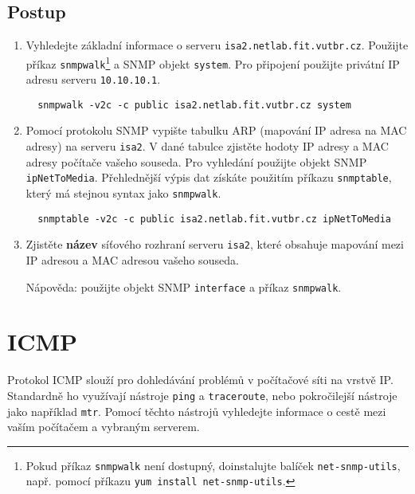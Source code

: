 \subsection*{Postup}
\begin{enumerate}
  \item Vyhledejte základní informace o serveru {\tt isa2.netlab.fit.vutbr.cz}.  Použijte příkaz {\tt snmpwalk}\footnote{Pokud příkaz {\tt snmpwalk} není dostupný, doinstalujte balíček \texttt{net-snmp-utils}, např. pomocí příkazu \texttt{yum install net-snmp-utils}.} a SNMP objekt \texttt{system}. Pro připojení použijte privátní IP adresu serveru \texttt{10.10.10.1}.
\begin{verbatim}
  snmpwalk -v2c -c public isa2.netlab.fit.vutbr.cz system
\end{verbatim}
  \item Pomocí protokolu SNMP vypište tabulku ARP (mapování IP adresa na MAC adresy) na serveru  {\tt isa2}. V dané tabulce zjistěte  hodoty IP adresy a MAC adresy počítače vašeho souseda. Pro vyhledání použijte objekt SNMP \texttt{ipNetToMedia}. Přehlednější výpis dat získáte použitím příkazu \texttt{snmptable}, který má stejnou syntax jako \texttt{snmpwalk}.
\begin{verbatim}
  snmptable -v2c -c public isa2.netlab.fit.vutbr.cz ipNetToMedia
\end{verbatim}
\item Zjistěte {\bf název} síťového rozhraní serveru {\tt isa2}, které obsahuje mapování mezi IP adresou a MAC adresou vašeho souseda.

  {\small Nápověda: použijte objekt SNMP \texttt{interface} a příkaz \texttt{snmpwalk}}.
\end{enumerate}

\section{ICMP}
Protokol ICMP slouží pro dohledávání problémů v počítačové síti na vrstvě IP. Standardně ho využívají nástroje \texttt{ping} a \texttt{traceroute}, nebo pokročilejší nástroje jako například \texttt{mtr}. Pomocí těchto nástrojů vyhledejte informace o cestě mezi vaším počítačem a vybraným serverem.

